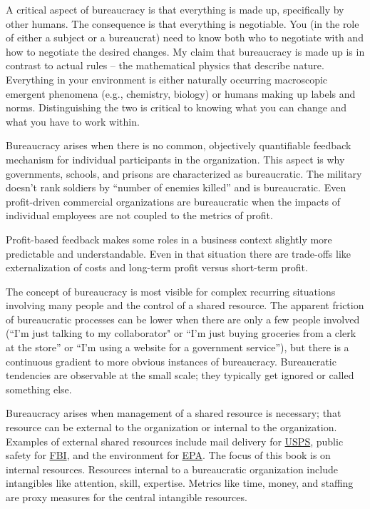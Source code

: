 A critical aspect of bureaucracy is that everything is made up, specifically by other humans. The consequence is that everything is negotiable. You (in the role of either a subject or a bureaucrat) need to know both who to negotiate with and how to negotiate the desired changes. My claim that bureaucracy is made up is in contrast to actual rules -- the mathematical physics that describe nature. Everything in your environment is either naturally occurring macroscopic emergent phenomena (e.g., chemistry, biology) or humans making up labels and norms. Distinguishing the two is critical to knowing what you can change and what you have to work within. 

Bureaucracy arises when there is no common, objectively quantifiable feedback mechanism for individual participants in the organization. This aspect is why governments, schools, and prisons are characterized as bureaucratic. The military doesn't rank soldiers by ``number of enemies killed'' and is bureaucratic. Even profit-driven commercial organizations are bureaucratic when the impacts of individual employees are not coupled to the metrics of profit. 

Profit-based feedback makes some roles in a business context slightly more predictable and understandable. Even in that situation there are trade-offs like externalization of costs and long-term profit versus short-term profit. 

The concept of bureaucracy is most visible for complex recurring situations involving many people and the control of a shared resource. The apparent friction of bureaucratic processes can be lower when there are only a few people involved (``I'm just talking to my collaborator" or ``I'm just buying groceries from a clerk at the store'' or ``I'm using a website for a government service''), but there is a continuous gradient to more obvious instances of bureaucracy. Bureaucratic tendencies are observable at the small scale; they typically get ignored or called something else.

Bureaucracy arises when management of a shared resource is necessary; that resource can be external to the organization or internal to the organization. Examples of external shared resources include mail delivery for \href{https://en.wikipedia.org/wiki/United_States_Postal_Service}{USPS}, public safety for \href{https://en.wikipedia.org/wiki/Federal_Bureau_of_Investigation}{FBI}, and the environment for \href{https://en.wikipedia.org/wiki/United_States_Environmental_Protection_Agency}{EPA}. The focus of this book is on internal resources. Resources internal to a bureaucratic organization include intangibles like attention, skill, expertise. Metrics like time, money, and staffing are proxy measures for the central intangible resources.



